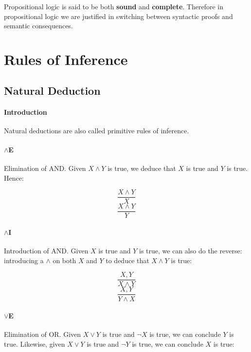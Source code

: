 \documentclass{article}
\theoremstyle{plain}
\theoremstyle{definition}
\begin{document}
\begin{multicols}{2}
Propositional logic is said to be both {\bf sound} and {\bf complete}. Therefore in propositional logic we are justified in switching between syntactic proofs and semantic consequences.

\section{Rules of Inference}

\subsection{Natural Deduction}

\paragraph{Introduction} Natural deductions are also called primitive rules of inference.

\paragraph{$\land$E} Elimination of AND. Given $X \land Y$ is true, we deduce that $X$ is true and $Y$ is true. Hence:

\begin{multicols}{2}
\begin{equation*}  
\frac{X \land Y}{X}
\end{equation*}
\break
\begin{equation*}
\frac{X \land Y}{Y}
\end{equation*}
\end{multicols}

\paragraph{$\land$I} Introduction of AND. Given $X$ is true and $Y$ is true, we can also do the reverse: introducing a $\land$ on both $X$ and $Y$ to deduce that $X \land Y$ is true:

\begin{multicols}{2}
\begin{equation*}  
\frac{X, Y}{X \land Y}
\end{equation*}
\break
\begin{equation*}  
\frac{X, Y}{Y \land X}
\end{equation*}
\end{multicols}

\paragraph{$\lor$E} Elimination of OR. Given $X \lor Y$ is true and $\lnot X$ is true, we can conclude $Y$ is true. Likewise, given $X \lor Y$ is true and $\lnot Y$ is true, we can conclude $X$ is true:


\end{multicols}
\end{document}
